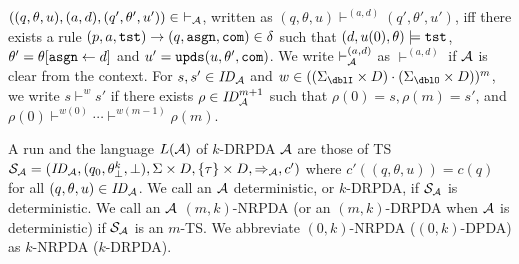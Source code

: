 $((q,\theta,u), (a,d), (q',\theta',u'))\in\ \vdash_\calA$,
written as $(q,\theta,u)\vdash^{(a,d)}(q',\theta',u')$, iff
there exists a rule $(p, a, \mathtt{tst}) \to (q, \mathtt{asgn}, \mathtt{com}) \in \delta$
such that
$(d, u(0), \theta)\models\mathtt{tst}$, $\theta' = \theta[\mathtt{asgn}\leftarrow d]$ and
$u'= \mathtt{upds}(u,\theta',\mathtt{com})$.
We write $\vdash^{(a,d)}_{\cal A}$ as $\vdash^{(a,d)}$ if ${\cal A}$ is clear from the context.
For $s,s'\in\mathit{ID}_{\cal A}$ and
$w\in((\Sigma_\dblI\times D)\cdot (\Sigma_\dblO\times D))^{m}$,
we write $s\vdash^{w}s'$ if
there exists $\rho\in\mathit{ID}_{\cal A}^{m+1}$ such that
$\rho(0)=s, \rho(m)=s'$, and
$\rho(0)\vdash^{w(0)}\cdots\vdash^{w(m-1)}\rho(m)$.

A run and the language $L({\cal A})$ of $k$-DRPDA ${\cal A}$ are those of TS
${\cal S}_{\cal A}=(\mathit{ID}_{\cal A}, (q_0, \theta^k_\bot, \bot), \Sigma\times D, \{\tau\}\times D, \Rightarrow_{\cal A}, c')$ where
$c'((q,\theta,u))=c(q)$ for all $(q,\theta,u)\in\mathit{ID}_{\cal A}$.
We call an ${\cal A}$ deterministic, or $k$-DRPDA, if ${\cal S}_{\cal A}$ is deterministic.
We call an ${\cal A}$ $(m,k)$-NRPDA (or an $(m,k)$-DRPDA when ${\cal A}$ is deterministic)
if ${\cal S}_{\cal A}$ is an $m$-TS.
We abbreviate $(0,k)$-NRPDA ($(0,k)$-DPDA) as $k$-NRPDA ($k$-DRPDA).

